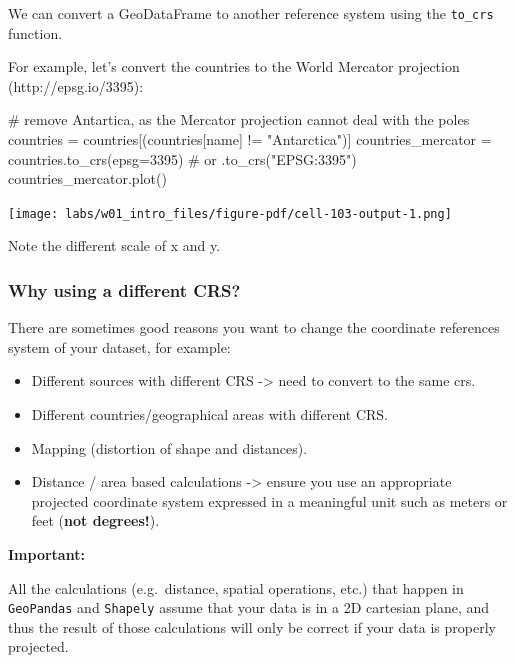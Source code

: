 \documentclass[
  letterpaper,
  DIV=11,
  numbers=noendperiod]{scrreprt}
\newenvironment{Shaded}{\begin{snugshade}}{\end{snugshade}}
\newcommand{\CommentTok}[1]{\textcolor[rgb]{0.37,0.37,0.37}{#1}}
\newcommand{\DecValTok}[1]{\textcolor[rgb]{0.68,0.00,0.00}{#1}}
\newcommand{\NormalTok}[1]{\textcolor[rgb]{0.00,0.23,0.31}{#1}}
\newcommand{\OperatorTok}[1]{\textcolor[rgb]{0.37,0.37,0.37}{#1}}
\newcommand{\StringTok}[1]{\textcolor[rgb]{0.13,0.47,0.30}{#1}}
\providecommand{\tightlist}{%
  \setlength{\itemsep}{0pt}\setlength{\parskip}{0pt}}\usepackage{longtable,booktabs,array}
\begin{document}
We can convert a GeoDataFrame to another reference system using the
\texttt{to\_crs} function.

For example, let's convert the countries to the World Mercator
projection (http://epsg.io/3395):

\begin{Shaded}
\begin{Highlighting}[]
\CommentTok{\# remove Antartica, as the Mercator projection cannot deal with the poles}
\NormalTok{countries }\OperatorTok{=}\NormalTok{ countries[(countries[}\StringTok{\textquotesingle{}name\textquotesingle{}}\NormalTok{] }\OperatorTok{!=} \StringTok{"Antarctica"}\NormalTok{)]}
\NormalTok{countries\_mercator }\OperatorTok{=}\NormalTok{ countries.to\_crs(epsg}\OperatorTok{=}\DecValTok{3395}\NormalTok{)  }\CommentTok{\# or .to\_crs("EPSG:3395")}
\NormalTok{countries\_mercator.plot()}
\end{Highlighting}
\end{Shaded}

\texttt{[image: labs/w01\_intro\_files/figure-pdf/cell-103-output-1.png]}

Note the different scale of x and y.

\subsubsection{Why using a different
CRS?}\label{why-using-a-different-crs}

There are sometimes good reasons you want to change the coordinate
references system of your dataset, for example:

\begin{itemize}
\tightlist
\item
  Different sources with different CRS -\textgreater{} need to convert
  to the same crs.\\
\item
  Different countries/geographical areas with different CRS.
\item
  Mapping (distortion of shape and distances).
\item
  Distance / area based calculations -\textgreater{} ensure you use an
  appropriate projected coordinate system expressed in a meaningful unit
  such as meters or feet (\textbf{not degrees!}).
\end{itemize}

\textbf{Important:}

All the calculations (e.g.~distance, spatial operations, etc.) that
happen in \texttt{GeoPandas} and \texttt{Shapely} assume that your data
is in a 2D cartesian plane, and thus the result of those calculations
will only be correct if your data is properly projected.
\end{document}
